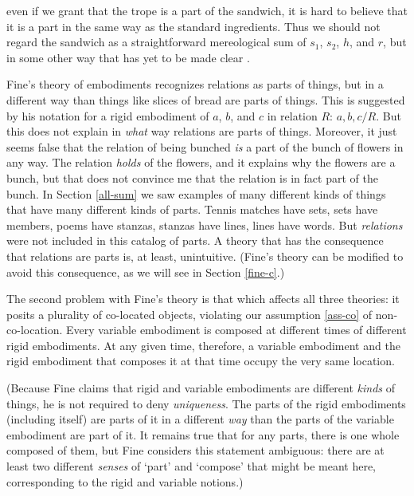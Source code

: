 \documentclass[11pt]{article}
\newenvironment{squote}{%
\begin{spacing}{1}
\begin{list}{}{%
\setlength{\labelwidth}{0pt}%
\rightmargin\leftmargin%
}
\item\relax
}{%
\end{list}%
\end{spacing}
}
\begin{document}
\begin{spacing}{1.5}
\begin{squote}
even if we grant that the trope is a part of the sandwich, it is hard
to believe that it is a part in the same way as the standard
ingredients.  Thus we should not regard the sandwich as a
straightforward mereological sum of $s_1$, $s_2$, $h$, and $r$, but in
some other way that has yet to be made clear \citep[64]{fine1999}.
\end{squote}

Fine's theory of embodiments recognizes relations as parts of things,
but in a different way than things like slices of bread are parts of
things.  This is suggested by his notation for a rigid embodiment of
$a$, $b$, and $c$ in relation $R$: $a, b, c / R$.  But this does not
explain in {\em what} way relations are parts of things.  Moreover, it
just seems false that the relation of being bunched {\em is} a part of
the bunch of flowers in any way.  The relation {\em holds} of the
flowers, and it explains why the flowers are a bunch, but that does
not convince me that the relation is in fact part of the bunch.  In
Section \ref{all-sum} we saw examples of many different kinds of
things that have many different kinds of parts.  Tennis matches have
sets, sets have members, poems have stanzas, stanzas have lines, lines
have words.  But {\em relations} were not included in this catalog of
parts.  A theory that has the consequence that relations are parts is,
at least, unintuitive.  (Fine's theory can be modified to avoid this
consequence, as we will see in Section \ref{fine-c}.)

The second problem with Fine's theory is that which affects all three
theories: it posits a plurality of co-located objects, violating our
assumption \ref{ass-co} of non-co-location.  Every variable embodiment
is composed at different times of different rigid embodiments.  At any
given time, therefore, a variable embodiment and the rigid embodiment
that composes it at that time occupy the very same location.

(Because Fine claims that rigid and variable embodiments are different
{\em kinds} of things, he is not required to deny {\em uniqueness}.
The parts of the rigid embodiments (including itself) are parts of it
in a different {\em way} than the parts of the variable embodiment are
part of it.  It remains true that for any parts, there is one whole
composed of them, but Fine considers this statement ambiguous: there
are at least two different {\em senses} of `part' and `compose' that
might be meant here, corresponding to the rigid and variable notions.)


\end{spacing}
\end{document}
